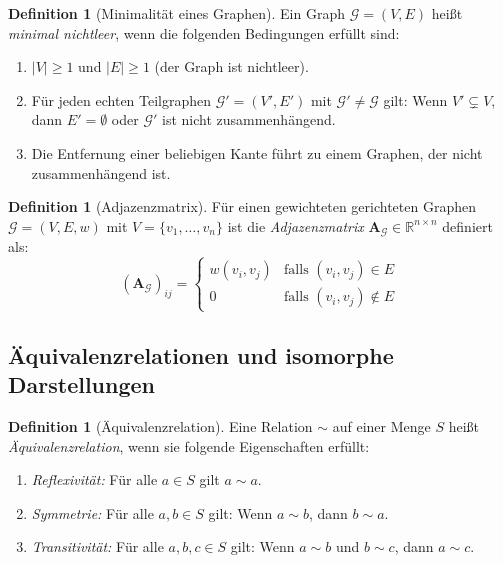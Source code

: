 \documentclass[12pt, a4paper]{article}
\theoremstyle{definition}
\newtheorem{definition}[theorem]{Definition}
\theoremstyle{remark}
\newcommand{\R}{\mathbb{R}}
\newcommand{\vA}{\bm{A}}
\newcommand{\Graph}{\mathcal{G}}
\begin{document}
\begin{definition}[Minimalität eines Graphen]
\label{def:minimalitaet}
Ein Graph $\Graph = (V, E)$ heißt \emph{minimal nichtleer}, wenn die folgenden Bedingungen erfüllt sind:
\begin{enumerate}[label=(\alph*)]
  \item $|V| \geq 1$ und $|E| \geq 1$ (der Graph ist nichtleer).
  \item Für jeden echten Teilgraphen $\Graph' = (V', E')$ mit $\Graph' \neq \Graph$ gilt: Wenn $V' \subsetneq V$, dann $E' = \emptyset$ oder $\Graph'$ ist nicht zusammenhängend.
  \item Die Entfernung einer beliebigen Kante führt zu einem Graphen, der nicht zusammenhängend ist.
\end{enumerate}
\end{definition}

\begin{definition}[Adjazenzmatrix]
\label{def:adjazenzmatrix}
Für einen gewichteten gerichteten Graphen $\Graph = (V, E, w)$ mit $V = \{v_1, \ldots, v_n\}$ ist die \emph{Adjazenzmatrix} $\vA_{\Graph} \in \R^{n \times n}$ definiert als:
\[
  (\vA_{\Graph})_{ij} = \begin{cases}
    w(v_i, v_j) & \text{falls } (v_i, v_j) \in E \\
    0 & \text{falls } (v_i, v_j) \notin E
  \end{cases}
\]
\end{definition}

\subsection{Äquivalenzrelationen und isomorphe Darstellungen}
\label{subsec:aequivalenz}

\begin{definition}[Äquivalenzrelation]
\label{def:aequivalenz}
Eine Relation $\sim$ auf einer Menge $S$ heißt \emph{Äquivalenzrelation}, wenn sie folgende Eigenschaften erfüllt:
\begin{enumerate}[label=(\alph*)]
  \item \emph{Reflexivität:} Für alle $a \in S$ gilt $a \sim a$.
  \item \emph{Symmetrie:} Für alle $a, b \in S$ gilt: Wenn $a \sim b$, dann $b \sim a$.
  \item \emph{Transitivität:} Für alle $a, b, c \in S$ gilt: Wenn $a \sim b$ und $b \sim c$, dann $a \sim c$.
\end{enumerate}
\end{definition}
\end{document}
